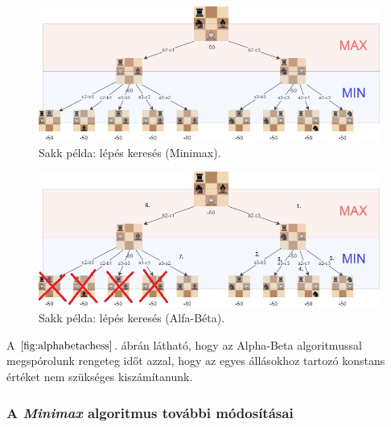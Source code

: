 \documentclass[12pt,margin=0px]{article}
\begin{document}
{    \begin{figure}[H]
		\centering
        \includegraphics[width=0.65\linewidth]{img/chess_minmax.jpeg}
		\caption{Sakk példa: lépés keresés (Minimax).}
		\label{fig:minmaxchess}
	\end{figure}

    \begin{figure}[H]
		\centering
        \includegraphics[width=0.65\linewidth]{img/chess_alphabeta.jpeg}
		\caption{Sakk példa: lépés keresés (Alfa-Béta).}
		\label{fig:alphabetachess}
	\end{figure}

    \noindent A $\ref{fig:alphabetachess}$. ábrán látható, hogy az Alpha-Beta algoritmussal megspórolunk rengeteg időt azzal, hogy az egyes állásokhoz tartozó konstans értéket nem szükséges kiszámítanunk.\\

	\subsubsection*{A \emph{Minimax} algoritmus további módosításai}

}
\end{document}
